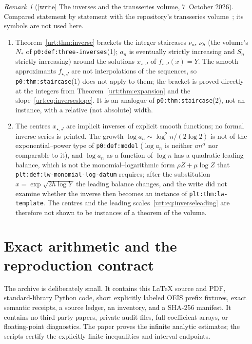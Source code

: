 \documentclass[11pt,letterpaper]{article}
\theoremstyle{remark}\newtheorem{remark}[theorem]{Remark}
\newcommand{\file}[1]{\nolinkurl{#1}}
\begin{document}
\begin{remark}[{[write]} The inverses and the transseries volume, 7~October 2026]\label{urt:rem:transseries}
Compared statement by statement with the repository's transseries
volume~\cite{TSvol}; its symbols are not used here.
\begin{enumerate}\raggedright
\item Theorem~\ref{urt:thm:inverse} brackets the integer staircases $\nu_a$, $\nu_S$ (the volume's $N_\ast$ of \file{p0:def:three-inverses}(1); $a_n$ is eventually strictly increasing and $S_n$ strictly increasing) around the solutions $x_{\star,J}$ of $f_{\star,J}(x)=Y$. The smooth approximants $f_{\star,J}$ are not interpolations of the sequences, so \file{p0:thm:staircase}(1) does not apply to them; the bracket is proved directly at the integers from Theorem~\ref{urt:thm:expansion} and the slope~\eqref{urt:eq:inverseslope}. It is an analogue of \file{p0:thm:staircase}(2), not an instance, with a relative (not absolute) width.
\item The centres $x_{\star,J}$ are implicit inverses of explicit smooth functions; no formal inverse series is printed. The growth $\log a_n\sim\log^2n/(2\log2)$ is not of the exponential--power type of \file{p0:def:model} ($\log a_n$ is neither $an^\alpha$ nor comparable to it), and $\log a_n$ as a function of $\log n$ has a quadratic leading balance, which is not the monomial--logarithmic form $\rho Z+\mu\log Z$ that \file{plt:def:lw-monomial-log-datum} requires; after the substitution $x=\exp\sqrt{2h\log Y}$ the leading balance changes, and the write did not examine whether the inverse then becomes an instance of \file{plt:thm:lw-template}. The centres and the leading scales~\eqref{urt:eq:inverseleading} are therefore not shown to be instances of a theorem of the volume.
\end{enumerate}
\end{remark}

\section{Exact arithmetic and the reproduction contract}\label{urt:sec:repro}
The archive is deliberately small. It contains this \LaTeX{} source and PDF, standard-library Python code, short explicitly labeled OEIS prefix fixtures, exact semantic receipts, a source ledger, an inventory, and a SHA-256 manifest. It contains no third-party papers, private audit files, full coefficient arrays, or floating-point diagnostics. The paper proves the infinite analytic estimates; the scripts certify the explicitly finite inequalities and interval endpoints.
\end{document}
